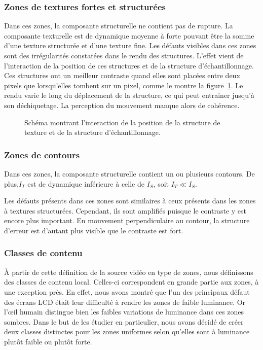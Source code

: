 \subsubsection{Zones de textures fortes et structurées}
Dans ces zones, la composante structurelle ne contient pas de rupture. La composante texturelle est de dynamique moyenne à forte pouvant être la somme d'une texture structurée et d'une texture fine. Les défauts visibles dans ces zones sont des irrégularités constatées dans le rendu des structures. L'effet vient de l'interaction de la position de ces structures et de la structure d'échantillonnage. Ces structures ont un meilleur contraste quand elles sont placées entre deux pixels que lorsqu'elles tombent sur un pixel, comme le montre la figure~\ref{fig:zone3}. Le rendu varie le long du déplacement de la structure, ce qui peut entrainer jusqu'à son déchiquetage. La perception du mouvement manque alors de cohérence.

\begin{figure}[htbp]
	\centering
	\caption{Schéma montrant l'interaction de la position de la structure de texture et de la structure d'échantillonnage.}
	\label{fig:zone3}
\end{figure}


\subsubsection{Zones de contours}
Dans ces zones, la composante structurelle contient un ou plusieurs contours. De plus,$I_T$ est de dynamique inférieure à celle de $I_S$, soit $I_T \ll I_S$.

Les défauts présents dans ces zones sont similaires à ceux présents dans les zones à textures structurées. Cependant, ils sont amplifiés puisque le contraste y est encore plus important. En mouvement perpendiculaire au contour, la structure d'erreur est d'autant plus visible que le contraste est fort.


\subsubsection{Classes de contenu}
À partir de cette définition de la source vidéo en type de zones, nous définissons des classes de contenu local. Celles-ci correspondent en grande partie aux zones, à une exception près. En effet, nous avons montré que l'un des principaux défaut des écrans LCD était leur difficulté à rendre les zones de faible luminance. Or l'\oe il humain distingue bien les faibles variations de luminance dans ces zones sombres. Dans le but de les étudier en particulier, nous avons décidé de créer deux classes distinctes pour les zones uniformes selon qu'elles sont à luminance plutôt faible ou plutôt forte.

